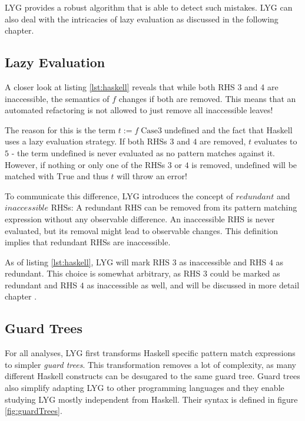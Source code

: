 LYG provides a robust algorithm that is able to detect such mistakes. LYG can also deal with the intricacies of lazy evaluation as discussed in the following chapter.

\subsection{Lazy Evaluation}

A closer look at listing \ref{lst:haskell} reveals that while both RHS 3 and 4 are inaccessible,
the semantics of $f$ changes if both are removed.
This means that an automated refactoring is not allowed to just remove all inaccessible leaves!

The reason for this is the term $t := f\;\mathrm{Case3}\;\mathrm{undefined}$ and the fact that Haskell uses a lazy evaluation strategy.
If both RHSs $3$ and $4$ are removed, $t$ evaluates to $5$ - the term $\mathrm{undefined}$ is never evaluated as no pattern matches against it.
However, if nothing or only one of the RHSs $3$ or $4$ is removed, $\mathrm{undefined}$ will be matched with $\mathrm{True}$ and thus $t$ will throw an error!

To communicate this difference, LYG introduces the concept of $\mathit{redundant}$ and $\mathit{inaccessible}$ RHSs:
A redundant RHS can be removed from its pattern matching expression without any observable difference.
An inaccessible RHS is never evaluated, but its removal might lead to observable changes.
This definition implies that redundant RHSs are inaccessible.

As of listing \ref{lst:haskell}, LYG will mark RHS $3$ as inaccessible and RHS $4$ as redundant.
This choice is somewhat arbitrary, as RHS $3$ could be marked as redundant and RHS $4$ as inaccessible as well, and will be discussed in more detail chapter .

\subsection{Guard Trees}

For all analyses, LYG first transforms Haskell specific pattern match expressions to simpler \textit{guard trees}.
This transformation removes a lot of complexity, as many different Haskell constructs can be desugared
to the same guard tree. Guard trees also simplify adapting LYG to other programming languages
and they enable studying LYG mostly independent from Haskell.
Their syntax is defined in figure \ref{fig:guardTrees}.

